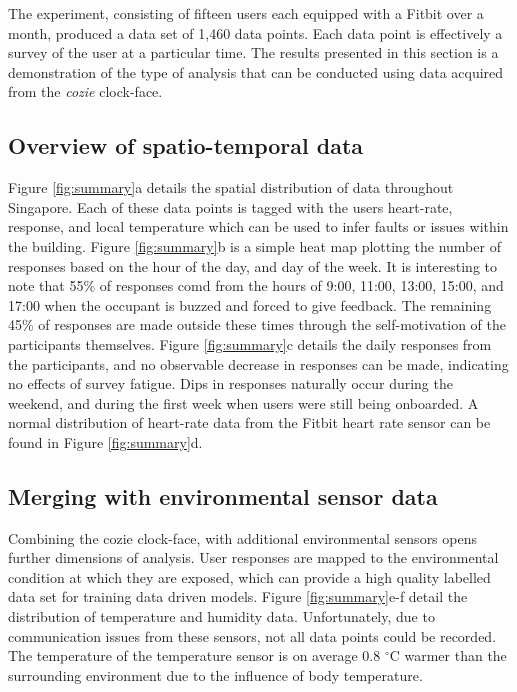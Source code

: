 
The experiment, consisting of fifteen users each equipped with a Fitbit over a month, produced a data set of 1,460 data points. Each data point is effectively a survey of the user at a particular time. The results presented in this section is a demonstration of the type of analysis that can be conducted using data acquired from the \emph{cozie} clock-face.

\subsection{Overview of spatio-temporal data}
Figure \ref{fig:summary}a details the spatial distribution of data throughout Singapore. Each of these data points is tagged with the users heart-rate, response, and local temperature which can be used to infer faults or issues within the building. Figure \ref{fig:summary}b is a simple heat map plotting the number of responses based on the hour of the day, and day of the week. It is interesting to note that 55\% of responses comd from the hours of 9:00, 11:00, 13:00, 15:00, and 17:00 when the occupant is buzzed and forced to give feedback. The remaining 45\% of responses are made outside these times through the self-motivation of the participants themselves. Figure \ref{fig:summary}c details the daily responses from the participants, and no observable decrease in responses can be made, indicating no effects of survey fatigue. Dips in responses naturally occur during the weekend, and during the first week when users were still being onboarded. A normal distribution of heart-rate data from the Fitbit heart rate sensor can be found in Figure \ref{fig:summary}d.

\subsection{Merging with environmental sensor data}
Combining the cozie clock-face, with additional environmental sensors opens further dimensions of analysis. User responses are mapped to the environmental condition at which they are exposed, which can provide a high quality labelled data set for training data driven models. Figure \ref{fig:summary}e-f detail the distribution of temperature and humidity data. Unfortunately, due to communication issues from these sensors, not all data points could be recorded. The temperature of the temperature sensor is on average 0.8 $^\circ$C warmer than the surrounding environment due to the influence of body temperature. 

